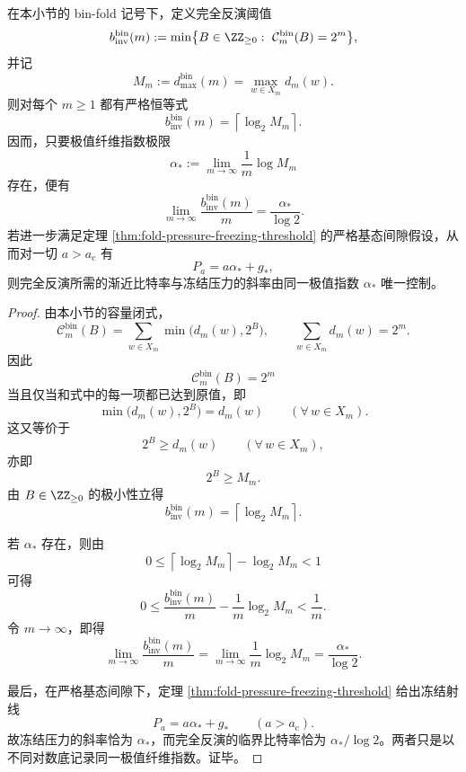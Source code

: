 \begin{theorem}[完全反演上折点与冻结斜率共享同一极值指数]\label{thm:conclusion-binfold-exact-inversion-upper-endpoint-freezing-slope}
在本小节的 bin-fold 记号下，定义完全反演阈值
\[
b_{\mathrm{inv}}^{\mathrm{bin}}(m)
:=
\min\bigl\{B\in \ZZ_{\ge 0}:\ \mathcal C_m^{\mathrm{bin}}(B)=2^m\bigr\},
\]
并记
\[
M_m:=d_{\max}^{\mathrm{bin}}(m)=\max_{w\in X_m}d_m(w).
\]
则对每个 \(m\ge 1\) 都有严格恒等式
\[
\boxed{\;
b_{\mathrm{inv}}^{\mathrm{bin}}(m)=\left\lceil \log_2 M_m\right\rceil.\;}
\]
因而，只要极值纤维指数极限
\[
\alpha_\ast:=\lim_{m\to\infty}\frac{1}{m}\log M_m
\]
存在，便有
\[
\boxed{\;
\lim_{m\to\infty}\frac{b_{\mathrm{inv}}^{\mathrm{bin}}(m)}{m}
=
\frac{\alpha_\ast}{\log 2}.\;}
\]
若进一步满足定理 \ref{thm:fold-pressure-freezing-threshold} 的严格基态间隙假设，从而对一切 \(a>a_{\mathrm c}\) 有
\[
P_a=a\alpha_\ast+g_\ast,
\]
则完全反演所需的渐近比特率与冻结压力的斜率由同一极值指数 \(\alpha_\ast\) 唯一控制。
\end{theorem}

\begin{proof}
由本小节的容量闭式，
\[
\mathcal C_m^{\mathrm{bin}}(B)
=
\sum_{w\in X_m}\min\bigl(d_m(w),2^B\bigr),
\qquad
\sum_{w\in X_m}d_m(w)=2^m.
\]
因此
\[
\mathcal C_m^{\mathrm{bin}}(B)=2^m
\]
当且仅当和式中的每一项都已达到原值，即
\[
\min\bigl(d_m(w),2^B\bigr)=d_m(w)
\qquad (\forall\, w\in X_m).
\]
这又等价于
\[
2^B\ge d_m(w)\qquad (\forall\, w\in X_m),
\]
亦即
\[
2^B\ge M_m.
\]
由 \(B\in\ZZ_{\ge 0}\) 的极小性立得
\[
b_{\mathrm{inv}}^{\mathrm{bin}}(m)=\left\lceil \log_2 M_m\right\rceil.
\]

若 \(\alpha_\ast\) 存在，则由
\[
0\le \left\lceil \log_2 M_m\right\rceil-\log_2 M_m<1
\]
可得
\[
0\le
\frac{b_{\mathrm{inv}}^{\mathrm{bin}}(m)}{m}
-\frac{1}{m}\log_2 M_m
<
\frac{1}{m}.
\]
令 \(m\to\infty\)，即得
\[
\lim_{m\to\infty}\frac{b_{\mathrm{inv}}^{\mathrm{bin}}(m)}{m}
=
\lim_{m\to\infty}\frac{1}{m}\log_2 M_m
=
\frac{\alpha_\ast}{\log 2}.
\]

最后，在严格基态间隙下，定理 \ref{thm:fold-pressure-freezing-threshold} 给出冻结射线
\[
P_a=a\alpha_\ast+g_\ast
\qquad (a>a_{\mathrm c}).
\]
故冻结压力的斜率恰为 \(\alpha_\ast\)，而完全反演的临界比特率恰为 \(\alpha_\ast/\log 2\)。两者只是以不同对数底记录同一极值纤维指数。证毕。
\end{proof}
